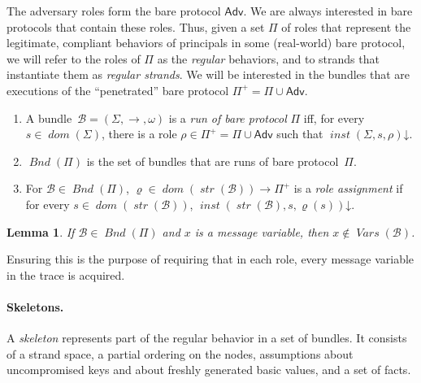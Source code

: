 \documentclass[12pt]{article}
\newcommand{\fn}[1]{\ensuremath{\operatorname{\mathit{#1}}}}
\newcommand{\sdom}{\fn{dom}}
\newcommand{\vars}{\fn{Vars}}
\newcommand{\defd}{\mathord\downarrow}
\newcommand{\bun}{\ensuremath{\mathcal{B}}}
\newcommand{\atom}{basic value}
\newcommand{\ssp}{\Sigma}
\newcommand{\strands}{\sdom}
\newcommand{\str}{\fn{str}}
\newcommand{\run}{\fn{Bnd}}
\newcommand{\nonatomic}{{message}}
\newcounter{running}[section]
\newenvironment{renumerate}{\begin{enumerate}%
\setcounter{enumi}{\value{running}}}%
{\setcounter{running}{\value{enumi}}\end{enumerate}}
\newtheorem{lemma}{Lemma}
\newcommand{\Adv}{\ensuremath{\mathsf{Adv}}}
\begin{document}
The adversary roles form the bare protocol $\Adv$.  We are always
interested in bare protocols that contain these roles.  Thus, given a set
$\Pi$ of roles that represent the legitimate, compliant behaviors of
principals in some (real-world) bare protocol, we will refer to the roles
of $\Pi$ as the \emph{regular} behaviors, and to strands that
instantiate them as \emph{regular strands}.  We will be interested in
the bundles that are executions of the ``penetrated'' bare protocol
$\Pi^+=\Pi\cup\Adv$.
%
\begin{renumerate}
%
  \item A bundle~$\bun=(\ssp,\to,\omega)$ is a \emph{run of bare
    protocol} $\Pi$ iff, for every $s\in\strands(\ssp)$, there is a
    role $\rho\in\Pi^+=\Pi\cup\Adv$ such that
    $\fn{inst}(\ssp,s,\rho)\defd$.
%
  \item $\run(\Pi)$ is the set of bundles that are runs of bare
    protocol~$\Pi$.

  \item For $\bun\in\run(\Pi)$, $\varrho\in\sdom(\str(\bun))\to\Pi^+$ is a
    \emph{role assignment} if for every $s\in\sdom(\str(\bun))$,
    $\fn{inst}(\str(\bun),s,\varrho(s))\defd$.

\end{renumerate}
%
\begin{lemma}
  If $\bun\in\run(\Pi)$ and $x$ is a {\nonatomic} variable, then
  $x\not\in\vars(\bun)$.
\end{lemma}
%
Ensuring this is the purpose of requiring that in each role, every
{\nonatomic} variable in the trace is acquired.

\paragraph{Skeletons.}

A \emph{skeleton} represents part of the regular behavior in a set of
bundles.  It consists of a strand space, a partial ordering on the
nodes, assumptions about uncompromised keys and about freshly
generated {\atom}s, and a set of facts.
\end{document}
